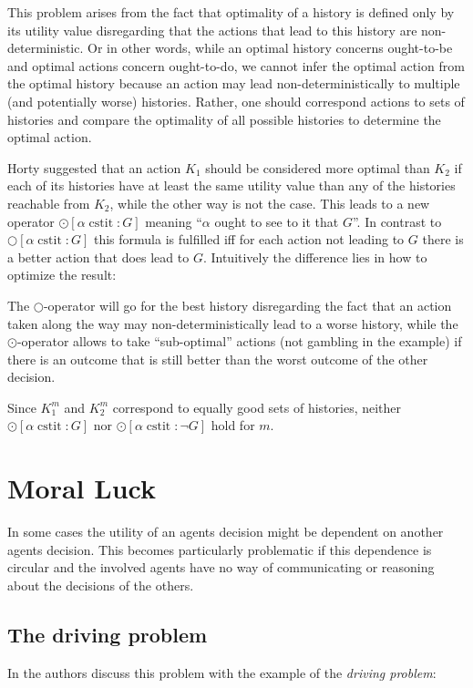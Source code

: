 \documentclass{article}
\newcommand{\cstit}{\operatorname{cstit}}
\begin{document}
This problem arises from the fact that optimality of a history is defined only by its utility value disregarding that the actions that lead to this history are non-deterministic. Or in other words, while an optimal history concerns ought-to-be and optimal actions concern ought-to-do, we cannot infer the optimal action from the optimal history because an action may lead non-deterministically to multiple (and potentially worse) histories. Rather, one should correspond actions to sets of histories and compare the optimality of all possible histories to determine the optimal action.

Horty suggested that an action $K_1$ should be considered more optimal than $K_2$ if each of its histories have at least the same utility value than any of the histories reachable from $K_2$, while the other way is not the case. This leads to a new operator $\odot [\alpha \cstit \colon G]$ meaning \enquote{$\alpha$ ought to see to it that $G$}. In contrast to $\bigcirc[\alpha \cstit \colon G]$ this formula is fulfilled iff for each action not leading to $G$ there is a better action that does lead to $G$. Intuitively the difference lies in how to optimize the result:

The $\bigcirc$-operator will go for the best history disregarding the fact that an action taken along the way may non-deterministically lead to a worse history, while the $\odot$-operator allows to take \enquote{sub-optimal} actions (not gambling in the example) if there is an outcome that is still better than the worst outcome of the other decision.

Since $K_1^m$ and $K_2^m$ correspond to equally good sets of histories, neither $\odot [\alpha \cstit \colon G]$ nor $\odot [\alpha \cstit \colon \neg G]$ hold for $m$.


\section{Moral Luck}
In some cases the utility of an agents decision might be dependent on another agents decision. This becomes particularly problematic if this dependence is circular and the involved agents have no way of communicating or reasoning about the decisions of the others.

\subsection{The driving problem}
In \cite{mdl} the authors discuss this problem with the example of the \emph{driving problem}:
\end{document}
